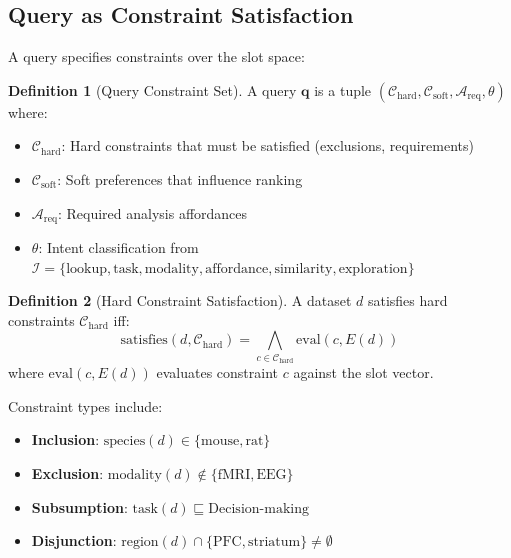 \documentclass{article}
\theoremstyle{definition}
\newtheorem{definition}{Definition}[section]
\newcommand{\query}{\mathbf{q}}
\begin{document}
\subsection{Query as Constraint Satisfaction}

A query specifies constraints over the slot space:

\begin{definition}[Query Constraint Set]
\label{def:query-constraints}
A query $\query$ is a tuple $(\mathcal{C}_{\text{hard}}, \mathcal{C}_{\text{soft}}, \mathcal{A}_{\text{req}}, \theta)$ where:
\begin{itemize}
    \item $\mathcal{C}_{\text{hard}}$: Hard constraints that must be satisfied (exclusions, requirements)
    \item $\mathcal{C}_{\text{soft}}$: Soft preferences that influence ranking
    \item $\mathcal{A}_{\text{req}}$: Required analysis affordances
    \item $\theta$: Intent classification from $\mathcal{I} = \{\text{lookup}, \text{task}, \text{modality}, \text{affordance}, \text{similarity}, \text{exploration}\}$
\end{itemize}
\end{definition}

\begin{definition}[Hard Constraint Satisfaction]
A dataset $d$ satisfies hard constraints $\mathcal{C}_{\text{hard}}$ iff:
\begin{equation}
    \text{satisfies}(d, \mathcal{C}_{\text{hard}}) = \bigwedge_{c \in \mathcal{C}_{\text{hard}}} \text{eval}(c, E(d))
\end{equation}
where $\text{eval}(c, E(d))$ evaluates constraint $c$ against the slot vector.
\end{definition}

Constraint types include:
\begin{itemize}
    \item \textbf{Inclusion}: $\text{species}(d) \in \{\text{mouse}, \text{rat}\}$
    \item \textbf{Exclusion}: $\text{modality}(d) \notin \{\text{fMRI}, \text{EEG}\}$
    \item \textbf{Subsumption}: $\text{task}(d) \sqsubseteq \text{Decision-making}$
    \item \textbf{Disjunction}: $\text{region}(d) \cap \{\text{PFC}, \text{striatum}\} \neq \emptyset$
\end{itemize}
\end{document}
